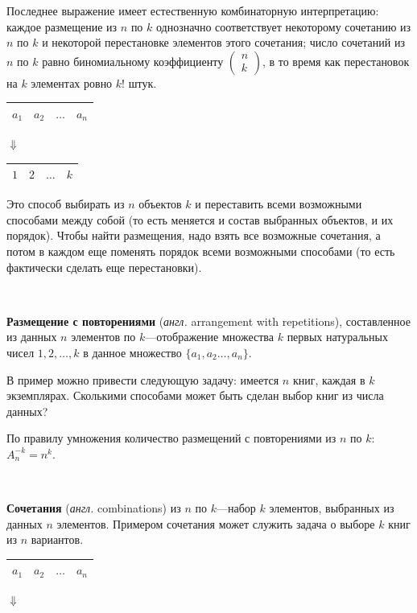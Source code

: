 Последнее выражение имеет естественную комбинаторную интерпретацию: каждое размещение из $n$ по $k$ однозначно соответствует некоторому сочетанию из $n$ по $k$ и некоторой перестановке элементов этого сочетания; число сочетаний из $n$ по $k$ равно биномиальному коэффициенту $\begin{pmatrix} n \\ k \end{pmatrix}$, в то время как перестановок на $k$ элементах ровно $k!$ штук.
\newpage
\begin{table}[h!]
	\begin{tabular}{|llll|}
		$a_1$ & $a_2$ & $\dots$ & $a_n$ \\ \hline
	\end{tabular}
\end{table}
$\Downarrow$
\begin{table}[h!]
	\begin{tabular}{|l|l|l|l|}
		$1$ & $2$ & $\dots$ & $k$ \\ \hline
	\end{tabular}
\end{table}

Это способ выбирать из $n$ объектов $k$ и переставить всеми возможными способами между собой (то есть меняется и состав выбранных объектов, и их порядок). Чтобы найти размещения, надо взять все возможные сочетания, а потом в каждом еще поменять порядок всеми возможными способами (то есть фактически сделать еще перестановки).

~

\textbf{Размещение с повторениями} (\textit{англ.} arrangement with repetitions), составленное из данных $n$ элементов по $k$—отображение множества $k$ первых натуральных чисел $1,2,\dots,k$ в данное множество $\{a_1,a_2\dots,a_n\}$.

В пример можно привести следующую задачу: имеется $n$ книг, каждая в $k$ экземплярах. Сколькими способами может быть сделан выбор книг из числа данных?

По правилу умножения количество размещений с повторениями из $n$ по $k$: $A_n^{-k} = n^k$.

~

\textbf{Сочетания} (\textit{англ.} combinations) из $n$ по $k$—набор $k$ элементов, выбранных из данных $n$ элементов. Примером сочетания может служить задача о выборе $k$ книг из $n$ вариантов.

\begin{table}[h!]
	\begin{tabular}{|llll|}
		$a_1$ & $a_2$ & $\dots$ & $a_n$ \\ \hline
	\end{tabular}
\end{table}
$\Downarrow$
\begin{table}[h!]
	\begin{tabular}{|llll|}
		&  &  &  \\ \hline
	\end{tabular}
\end{table}

